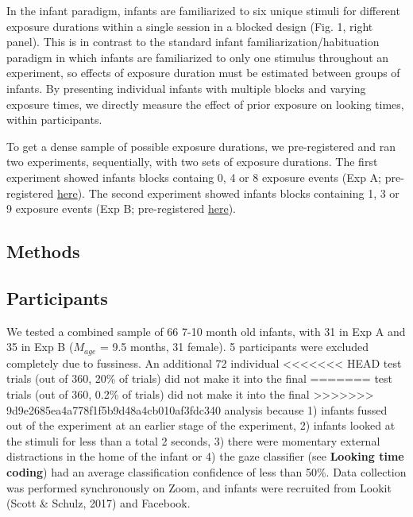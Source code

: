 \documentclass[10pt, letterpaper]{article}
\begin{document}
In the infant paradigm, infants are familiarized to six unique stimuli
for different exposure durations within a single session in a blocked
design (Fig. 1, right panel). This is in contrast to the standard infant
familiarization/habituation paradigm in which infants are familiarized
to only one stimulus throughout an experiment, so effects of exposure
duration must be estimated between groups of infants. By presenting
individual infants with multiple blocks and varying exposure times, we
directly measure the effect of prior exposure on looking times, within
participants.

To get a dense sample of possible exposure durations, we pre-registered
and ran two experiments, sequentially, with two sets of exposure
durations. The first experiment showed infants blocks containg 0, 4 or 8
exposure events (Exp A; pre-registered
\href{https://osf.io/gux4f/?view_only=b4d6d0118dfa41a79fb431d389f4fecc}{here}).
The second experiment showed infants blocks containing 1, 3 or 9
exposure events (Exp B; pre-registered
\href{https://osf.io/w6pgu/?view_only=39ee108159884761a0c5bc68d11918df}{here}).

\hypertarget{methods-1}{%
\subsection{Methods}\label{methods-1}}

\hypertarget{participants-1}{%
\subsection{Participants}\label{participants-1}}

We tested a combined sample of 66 7-10 month old infants, with 31 in Exp
A and 35 in Exp B (\(M_{age}\) = 9.5 months, 31 female). 5 participants
were excluded completely due to fussiness. An additional 72 individual
<<<<<<< HEAD
test trials (out of 360, 20\% of trials) did not make it into the final
=======
test trials (out of 360, 0.2\% of trials) did not make it into the final
>>>>>>> 9d9e2685ea4a778f1f5b9d48a4cb010af3fdc340
analysis because 1) infants fussed out of the experiment at an earlier
stage of the experiment, 2) infants looked at the stimuli for less than
a total 2 seconds, 3) there were momentary external distractions in the
home of the infant or 4) the gaze classifier (see \textbf{Looking time
coding}) had an average classification confidence of less than 50\%.
Data collection was performed synchronously on Zoom, and infants were
recruited from Lookit (Scott \& Schulz, 2017) and Facebook.
\end{document}
